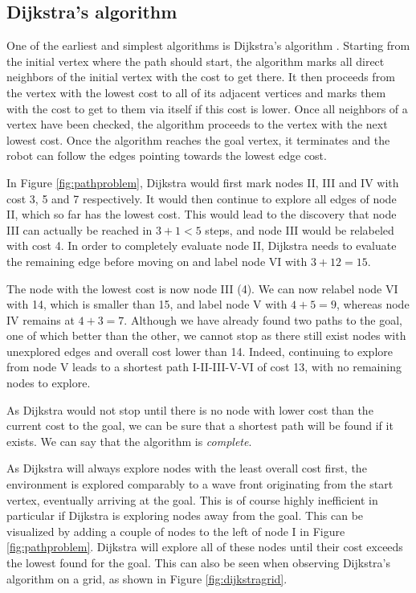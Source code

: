 \subsection{Dijkstra's algorithm}
One of the earliest and simplest algorithms is Dijkstra's algorithm \cite{dijkstra1959note}. Starting from the initial vertex where the path should start, the algorithm marks all direct neighbors of the initial vertex with the cost to get there. It then proceeds from the vertex with the lowest cost to all of its adjacent vertices and marks them with the cost to get to them via itself if this cost is lower. Once all neighbors of a vertex have been checked, the algorithm proceeds to the vertex with the next lowest cost. Once the algorithm reaches the goal vertex, it terminates and the robot can follow the edges pointing towards the lowest edge cost.

In Figure \ref{fig:pathproblem}, Dijkstra would first mark nodes II, III and IV with cost 3, 5 and 7 respectively. It would then continue to explore all edges of node II, which so far has the lowest cost. This would lead to the discovery that node III can actually be reached in $3+1<5$ steps, and node III would be relabeled with cost 4. In order to completely evaluate node II, Dijkstra needs to evaluate the remaining edge before moving on and label node VI with $3+12=15$.

The node with the lowest cost is now node III (4). We can now relabel node VI with 14, which is smaller than 15, and label node V with $4+5=9$, whereas node IV remains at $4+3=7$. Although we have already found two paths to the goal, one of which better than the other, we cannot stop as there still exist nodes with unexplored edges and overall cost lower than 14. Indeed, continuing to explore from node V leads to a shortest path I-II-III-V-VI of cost 13, with no remaining nodes to explore.

As Dijkstra would not stop until there is no node with lower cost than the current cost to the goal, we can be sure that a shortest path will be found if it exists. We can say that the algorithm is \emph{complete}.

As Dijkstra will always explore nodes with the least overall cost first, the environment is explored comparably to a wave front originating from the start vertex, eventually arriving at the goal. This is of course highly inefficient in particular if Dijkstra is exploring nodes away from the goal. This can be visualized by adding a couple of nodes to the left of node I in Figure \ref{fig:pathproblem}. Dijkstra will explore all of these nodes until their cost exceeds the lowest found for the goal. This can also be seen when observing Dijkstra's algorithm on a grid, as shown in Figure \ref{fig:dijkstragrid}.

